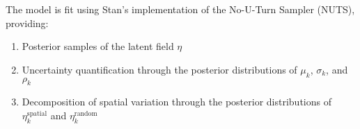\documentclass[
  letterpaper,
  DIV=11,
  numbers=noendperiod]{scrartcl}
\providecommand{\tightlist}{%
  \setlength{\itemsep}{0pt}\setlength{\parskip}{0pt}}\usepackage{longtable,booktabs,array}
\begin{document}
The model is fit using Stan's implementation of the No-U-Turn Sampler
(NUTS), providing:

\begin{enumerate}
\def\labelenumi{\arabic{enumi}.}
\tightlist
\item
  Posterior samples of the latent field \(\eta\)
\item
  Uncertainty quantification through the posterior distributions of
  \(\mu_k\), \(\sigma_k\), and \(\rho_k\)
\item
  Decomposition of spatial variation through the posterior distributions
  of \(\eta^{\mathrm{spatial}}_k\) and \(\eta^{\mathrm{random}}_k\)
\end{enumerate}
\end{document}
